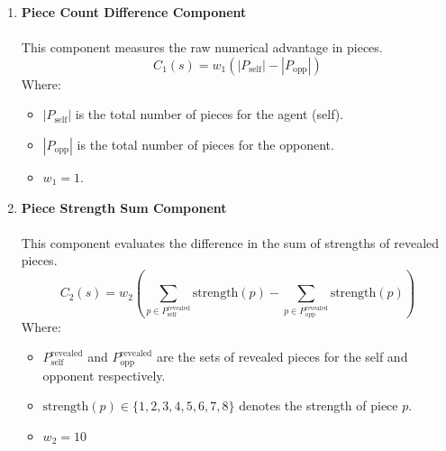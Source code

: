 \documentclass{article}
\begin{document}
\begin{enumerate}
    \item \textbf{Piece Count Difference Component}
            \\
            \\
            This component measures the raw numerical advantage in pieces.
            \begin{equation}
            \label{eq:minimax_c1_base}
            C_1(s) = w_1 (|P_{\text{self}}| - |P_{\text{opp}}|)
            \end{equation}
            Where:
            \begin{itemize}
                \item $|P_{\text{self}}|$ is the total number of pieces for the agent (self).
                \item $|P_{\text{opp}}|$ is the total number of pieces for the opponent.
                \item  $w_1 = 1$.
            \end{itemize}
    
    \item  \textbf{Piece Strength Sum Component}
            \\
            \\
            This component evaluates the difference in the sum of strengths of revealed pieces.
            \begin{equation}
            \label{eq:minimax_c2_base}
            C_2(s) = w_2 \left(\sum_{p \in P_{\text{self}}^{\text{revealed}}} \text{strength}(p) - \sum_{p \in P_{\text{opp}}^{\text{revealed}}} \text{strength}(p)\right)
            \end{equation}
            Where:
            \begin{itemize}
                \item $P_{\text{self}}^{\text{revealed}}$ and $P_{\text{opp}}^{\text{revealed}}$ are the sets of revealed pieces for the self and opponent respectively.
                \item $\text{strength}(p) \in \{1, 2, 3, 4, 5, 6, 7, 8\}$ denotes the strength of piece $p$.
                \item $w_2 = 10$
            \end{itemize}
            


\end{enumerate}
\end{document}
